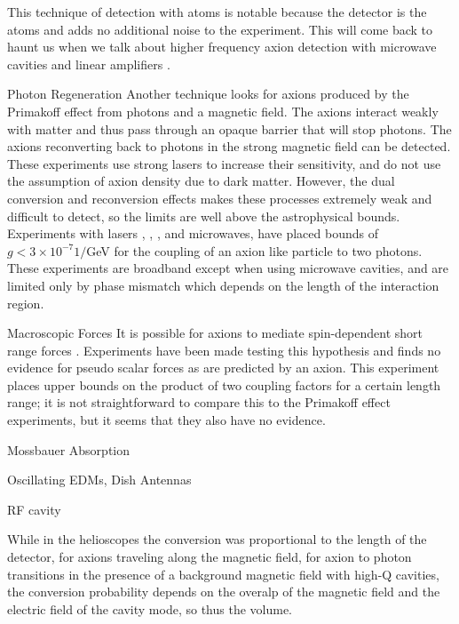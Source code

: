 \documentclass[12pt,twosides]{book}
\begin{document}
\begin{description}
This technique of detection with atoms is notable because the detector is the atoms and adds no additional noise to the experiment. This will come back to haunt us when we talk about higher frequency axion detection with microwave cavities and linear amplifiers \cite{lamoreaux13}.

\item{Photon Regeneration}
Another technique looks for axions produced by the Primakoff effect from photons and a magnetic field. The axions interact weakly with matter and thus pass through an opaque barrier that will stop photons. The axions reconverting back to photons in the strong magnetic field can be detected. These experiments use strong lasers to increase their sensitivity, and do not use the assumption of axion density due to dark matter. However, the dual conversion and reconversion effects makes these processes extremely weak and difficult to detect, so the limits are well above the astrophysical bounds. Experiments with lasers \cite{ehret10}, \cite{sulc13}, \cite{chou07}, and microwaves\cite{betz13}, have placed bounds of $g < 3 \times 10^{-7} 1/$GeV for the coupling of an axion like particle to two photons.
These experiments are broadband except when using microwave cavities, and are limited only by phase mismatch which depends on the length of the interaction region. 

\item{Macroscopic Forces}
It is possible for axions to mediate spin-dependent short range forces \cite{moody84}. Experiments have been made testing this hypothesis \cite{tullney13} and finds no evidence for pseudo scalar forces as are predicted by an axion. This experiment places upper bounds on the product of two coupling factors for a certain length range; it is not straightforward to compare this to the Primakoff effect experiments, but it seems that they also have no evidence.


\item{Mossbauer Absorption}

\item{Oscillating EDMs, Dish Antennas}

\item{RF cavity}

While in the helioscopes the conversion was proportional to the length of the detector, for axions traveling along the magnetic field, for axion to photon transitions in the presence of a background magnetic field with high-Q cavities, the conversion probability depends on the overalp of the magnetic field and the electric field of the cavity mode, so thus the volume.

\end{description}
\end{document}
